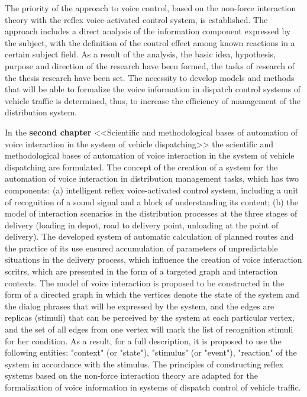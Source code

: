 The priority of the approach to voice control, based on the non-force interaction theory with the reflex voice-activated control system, is established. The approach includes a direct analysis of the information component expressed by the subject, with the definition of the control effect among known reactions in a certain subject field.
As a result of the analysis, the basic idea, hypothesis, purpose and direction of the research have been formed, the tasks of research of the thesis research have been set. The necessity to develop models and methods that will be able to formalize the voice information in dispatch control systems of vehicle traffic is determined, thus, to increase the efficiency of management of the distribution system.

In the \textbf{second chapter} <<Scientific and methodological bases of automation of voice interaction in the system of vehicle dispatching>> the scientific and methodological bases of automation of voice interaction in the system of vehicle dispatching are formulated.
The concept of the creation of a system for the automation of voice interaction in distribution management tasks, which has two components: (a) intelligent reflex voice-activated control system, including a unit of recognition of a sound signal and a block of understanding its content; (b) the model of interaction scenarios in the distribution processes at the three stages of delivery (loading in depot, road to delivery point, unloading at the point of delivery).
The developed system of automatic calculation of planned routes and the practice of its use ensured accumulation of parameters of unpredictable situations in the delivery process, which influence the creation of voice interaction scritrs, which are presented in the form of a targeted graph and interaction contexts.
The model of voice interaction is proposed to be constructed in the form of a directed graph in which the vertices denote the state of the system and the dialog phrases that will be expressed by the system, and the edges are replicas (stimuli) that can be perceived by the system at each particular vertex, and the set of all edges from one vertex will mark the list of recognition stimuli for her condition. As a result, for a full description, it is proposed to use the following entities: "context" (or "state"), "stimulus" (or "event"), "reaction" of the system in accordance with the stimulus.
The principles of constructing reflex systems based on the non-force interaction theory are adapted for the formalization of voice information in systems of dispatch control of vehicle traffic.

